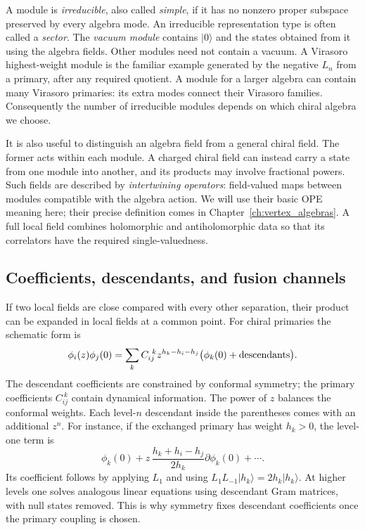 A module is \emph{irreducible}, also called \emph{simple}, if it
has no nonzero proper subspace preserved by every algebra mode.
An irreducible representation type is often called a \emph{sector}.
The \emph{vacuum module} contains $|0\rangle$ and the states
obtained from it using the algebra fields. Other modules need not
contain a vacuum. A Virasoro highest-weight module is the familiar
example generated by the negative $L_n$ from a primary, after any
required quotient. A module for a larger algebra can contain many
Virasoro primaries: its extra modes connect their Virasoro families.
Consequently the number of irreducible modules depends on which
chiral algebra we choose.

It is also useful to distinguish an algebra field from a general
chiral field. The former acts within each module. A charged chiral
field can instead carry a state from one module into another, and
its products may involve fractional powers. Such fields are described
by \emph{intertwining operators}: field-valued maps between modules
compatible with the algebra action. We will use their basic OPE
meaning here; their precise definition comes in
Chapter~\ref{ch:vertex_algebras}. A full local field combines holomorphic and
antiholomorphic data so that its correlators have the required
single-valuedness.

\subsection{Coefficients, descendants, and fusion channels}

If two local fields are close compared with every other separation,
their product can be expanded in local fields at a common point.
For chiral primaries the schematic form is
\begin{equation}
 \phi_i(z)\phi_j(0)
 =\sum_k C_{ij}^{\ k}z^{h_k-h_i-h_j}
       \bigl(\phi_k(0)+\hbox{descendants}\bigr).
 \label{eq:cft-primary-ope}
\end{equation}
The descendant coefficients are constrained by conformal symmetry;
the primary coefficients $C_{ij}^{\ k}$ contain dynamical information.
The power of $z$ balances the conformal weights. Each level-$n$
descendant inside the parentheses comes with an additional $z^n$.
For instance, if the exchanged primary has weight $h_k>0$, the
level-one term is
\[
 \phi_k(0)+z\,\frac{h_k+h_i-h_j}{2h_k}
                    \partial\phi_k(0)+\cdots.
\]
Its coefficient follows by applying $L_1$ and using
$L_1L_{-1}|h_k\rangle=2h_k|h_k\rangle$. At higher levels one
solves analogous linear equations using descendant Gram matrices,
with null states removed. This is why symmetry fixes descendant
coefficients once the primary coupling is chosen.

